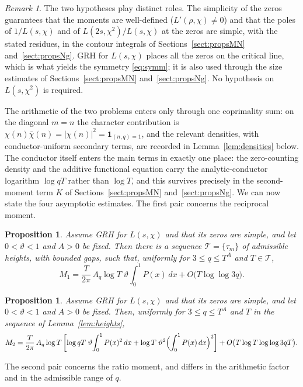 \documentclass[12pt,a4paper,reqno]{amsart}
\newtheorem{proposition}[theorem]{Proposition}
\theoremstyle{remark}
\newtheorem*{remark}{Remark}
\numberwithin{equation}{section}
\begin{document}
\begin{remark}
The two hypotheses play distinct roles. The simplicity of the zeros guarantees that the moments are well-defined ($L'(\rho,\chi)\ne0$) and that the poles of $1/L(s,\chi)$ and of $L(2s,\chi^2)/L(s,\chi)$ at the zeros are simple, with the stated residues, in the contour integrals of Sections~\ref{sect:propsMN} and~\ref{sect:propsNg}. GRH for $L(s,\chi)$ places all the zeros on the critical line, which is what yields the symmetry \eqref{eq:symm}; it is also used through the size estimates of Sections~\ref{sect:propsMN} and~\ref{sect:propsNg}. No hypothesis on $L(s,\chi^2)$ is required.
\end{remark}

The arithmetic of the two problems enters only through one coprimality sum: on the diagonal $m=n$ the character contribution is $\chi(n)\bar\chi(n)=|\chi(n)|^2=\mathbf 1_{(n,q)=1}$, and the relevant densities, with conductor-uniform secondary terms, are recorded in Lemma~\ref{lem:densities} below. The conductor itself enters the main terms in exactly one place: the zero-counting density and the additive functional equation carry the analytic-conductor logarithm $\log qT$ rather than $\log T$, and this survives precisely in the second-moment term $K$ of Sections~\ref{sect:propsMN} and~\ref{sect:propsNg}. We can now state the four asymptotic estimates. The first pair concerns the reciprocal moment.

\begin{proposition}\label{prop:M1MN}
Assume GRH for $L(s,\chi)$ and that its zeros are simple, and let $0<\vartheta<1$ and $A>0$ be fixed. Then there is a sequence $\mathcal T=\{\tau_m\}$ of admissible heights, with bounded gaps, such that, uniformly for $3\le q\le T^{A}$ and $T\in\mathcal T$,
\[
M_1=\frac{T}{2\pi}\,A_q\log T\;\vartheta\!\int_0^1 P(x)\,dx+O\bigl(T\log\log 3q\bigr).
\]
\end{proposition}

\begin{proposition}\label{prop:M2MN}
Assume GRH for $L(s,\chi)$ and that its zeros are simple, and let $0<\vartheta<1$ and $A>0$ be fixed. Then, uniformly for $3\le q\le T^{A}$ and $T$ in the sequence of Lemma~\ref{lem:heights},
\[
M_2=\frac{T}{2\pi}\,A_q\log T\left[\log qT\;\vartheta\!\int_0^1 P(x)^2\,dx+\log T\;\vartheta^2\Bigl(\int_0^1 P(x)\,dx\Bigr)^2\right]+O\bigl(T\log T\log\log 3qT\bigr).
\]
\end{proposition}

The second pair concerns the ratio moment, and differs in the arithmetic factor and in the admissible range of $q$.
\end{document}
